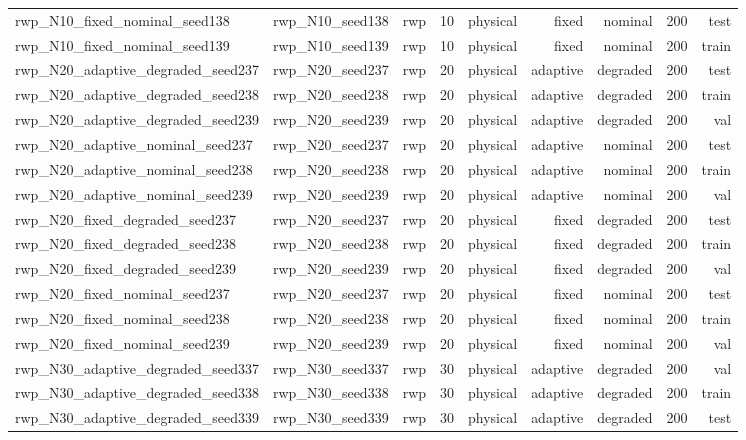 \begin{tabular}{lrrrrrrrr}
rwp\_N10\_fixed\_nominal\_seed138 & rwp\_N10\_seed138 & rwp & 10 & physical & fixed & nominal & 200 & test \\
rwp\_N10\_fixed\_nominal\_seed139 & rwp\_N10\_seed139 & rwp & 10 & physical & fixed & nominal & 200 & train \\
rwp\_N20\_adaptive\_degraded\_seed237 & rwp\_N20\_seed237 & rwp & 20 & physical & adaptive & degraded & 200 & test \\
rwp\_N20\_adaptive\_degraded\_seed238 & rwp\_N20\_seed238 & rwp & 20 & physical & adaptive & degraded & 200 & train \\
rwp\_N20\_adaptive\_degraded\_seed239 & rwp\_N20\_seed239 & rwp & 20 & physical & adaptive & degraded & 200 & val \\
rwp\_N20\_adaptive\_nominal\_seed237 & rwp\_N20\_seed237 & rwp & 20 & physical & adaptive & nominal & 200 & test \\
rwp\_N20\_adaptive\_nominal\_seed238 & rwp\_N20\_seed238 & rwp & 20 & physical & adaptive & nominal & 200 & train \\
rwp\_N20\_adaptive\_nominal\_seed239 & rwp\_N20\_seed239 & rwp & 20 & physical & adaptive & nominal & 200 & val \\
rwp\_N20\_fixed\_degraded\_seed237 & rwp\_N20\_seed237 & rwp & 20 & physical & fixed & degraded & 200 & test \\
rwp\_N20\_fixed\_degraded\_seed238 & rwp\_N20\_seed238 & rwp & 20 & physical & fixed & degraded & 200 & train \\
rwp\_N20\_fixed\_degraded\_seed239 & rwp\_N20\_seed239 & rwp & 20 & physical & fixed & degraded & 200 & val \\
rwp\_N20\_fixed\_nominal\_seed237 & rwp\_N20\_seed237 & rwp & 20 & physical & fixed & nominal & 200 & test \\
rwp\_N20\_fixed\_nominal\_seed238 & rwp\_N20\_seed238 & rwp & 20 & physical & fixed & nominal & 200 & train \\
rwp\_N20\_fixed\_nominal\_seed239 & rwp\_N20\_seed239 & rwp & 20 & physical & fixed & nominal & 200 & val \\
rwp\_N30\_adaptive\_degraded\_seed337 & rwp\_N30\_seed337 & rwp & 30 & physical & adaptive & degraded & 200 & val \\
rwp\_N30\_adaptive\_degraded\_seed338 & rwp\_N30\_seed338 & rwp & 30 & physical & adaptive & degraded & 200 & train \\
rwp\_N30\_adaptive\_degraded\_seed339 & rwp\_N30\_seed339 & rwp & 30 & physical & adaptive & degraded & 200 & test \\

\end{tabular}
